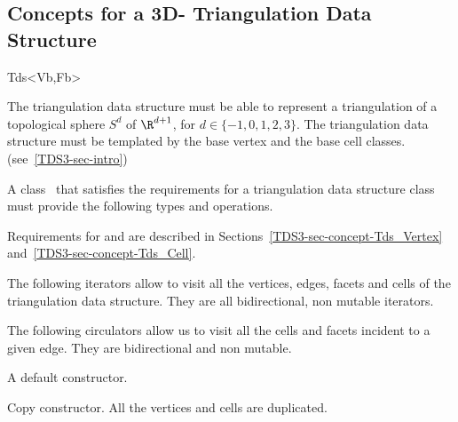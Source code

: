 \subsection{Concepts for a 3D- Triangulation Data Structure}
\label{TDS3-sec-concept} 
\begin{ccClassTemplate}{Tds<Vb,Fb>}

The triangulation data structure must be able to represent a
triangulation of a topological sphere $S^d$ of $\R^{d+1}$, for $d \in
\{-1,0,1,2,3\}$.
The triangulation data structure must be templated by the base
vertex and the base cell classes. 
(see~\ref{TDS3-sec-intro})


A class \ccClassTemplateName\ that satisfies the requirements for a
triangulation data structure class must provide the following types and
operations. 

\ccTypes
{}
\ccThreeToTwo

\ccGlue
{}
Requirements for  and  are described in
Sections~\ref{TDS3-sec-concept-Tds_Vertex}
and~\ref{TDS3-sec-concept-Tds_Cell}.

\ccGlue
{} 


The following iterators allow to visit all the vertices, edges, facets
and cells of the triangulation data structure. They are all
bidirectional, non mutable iterators.

\ccGlue
{}
\ccGlue
{}
\ccGlue
{}

The following circulators allow us to visit all the cells and facets
incident to a given edge. They are bidirectional and non mutable.

\ccGlue
{}

\ccCreation
{}

{A default constructor.}

{Copy constructor. All the vertices and cells are duplicated.}


\end{ccClassTemplate}

